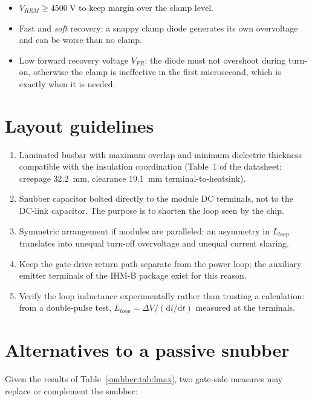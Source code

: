 \begin{itemize}[nosep]
\item $V_{RRM} \ge \SI{4500}{\volt}$ to keep margin over the clamp level.
\item Fast and \emph{soft} recovery: a snappy clamp diode generates its own
      overvoltage and can be worse than no clamp.
\item Low forward recovery voltage $V_{FR}$: the diode must not overshoot
      during turn-on, otherwise the clamp is ineffective in the first
      microsecond, which is exactly when it is needed.
\end{itemize}

\section{Layout guidelines}

\begin{enumerate}[nosep]
\item Laminated busbar with maximum overlap and minimum dielectric thickness
      compatible with the insulation coordination
      (Table~1 of the datasheet: creepage \SI{32.2}{\milli\metre}, clearance
      \SI{19.1}{\milli\metre} terminal-to-heatsink).
\item Snubber capacitor bolted directly to the module DC terminals, not to the
      DC-link capacitor. The purpose is to shorten the loop seen by the chip.
\item Symmetric arrangement if modules are paralleled: an asymmetry in
      $L_{loop}$ translates into unequal turn-off overvoltage and unequal
      current sharing.
\item Keep the gate-drive return path separate from the power loop; the
      auxiliary emitter terminals of the IHM-B package exist for this reason.
\item Verify the loop inductance experimentally rather than trusting a
      calculation: from a double-pulse test,
      $L_{loop} = \Delta V / (\mathrm{d}i/\mathrm{d}t)$ measured at the
      terminals.
\end{enumerate}

\section{Alternatives to a passive snubber}

Given the results of Table~\ref{snubber:tab:lmax}, two gate-side measures may replace
or complement the snubber:


